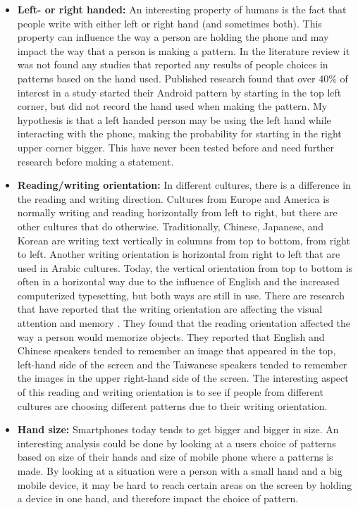 \begin{itemize}
    \item {\bf Left- or right handed:} An interesting property of humans is the fact that people write with either left or right hand (and sometimes both). This property can influence the way a person are holding the phone and may impact the way that a person is making a pattern. In the literature review it was not found any studies that reported any results of people choices in patterns based on the hand used. Published research \cite{Uellenbeck} found that over 40\% of interest in a study started their Android pattern by starting in the top left corner, but did not record the hand used when making the pattern. My hypothesis is that a left handed person may be using the left hand while interacting with the phone, making the probability for starting in the right upper corner bigger. This have never been tested before and need further research before making a statement. 
    \item {\bf Reading/writing orientation:} In different cultures, there is a difference in the reading and writing direction. Cultures from Europe and America is normally writing and reading horizontally from left to right, but there are other cultures that do otherwise. Traditionally, Chinese, Japanese, and Korean are writing text vertically in columns from top to bottom, from right to left. Another writing orientation is horizontal from right to left that are used in Arabic cultures. Today, the vertical orientation from top to bottom is often in a horizontal way due to the influence of English and the increased computerized typesetting, but both ways are still in use. There are research that have reported that the writing orientation are affecting the visual attention and memory \cite{Chan}. They found that the reading orientation affected the way a person would memorize objects. They reported that English and Chinese speakers tended to remember an image that appeared in the top, left-hand side of the screen and the Taiwanese speakers tended to remember the images in the upper right-hand side of the screen. The interesting aspect of this reading and writing orientation is to see if people from different cultures are choosing different patterns due to their writing orientation.
    \item {\bf Hand size:} Smartphones today tends to get bigger and bigger in size. An interesting analysis could be done by looking at a users choice of patterns based on size of their hands and size of mobile phone where a patterns is made. By looking at a situation were a person with a small hand and a big mobile device, it may be hard to reach certain areas on the screen by holding a device in one hand, and therefore impact the choice of pattern. 
  \end{itemize}

